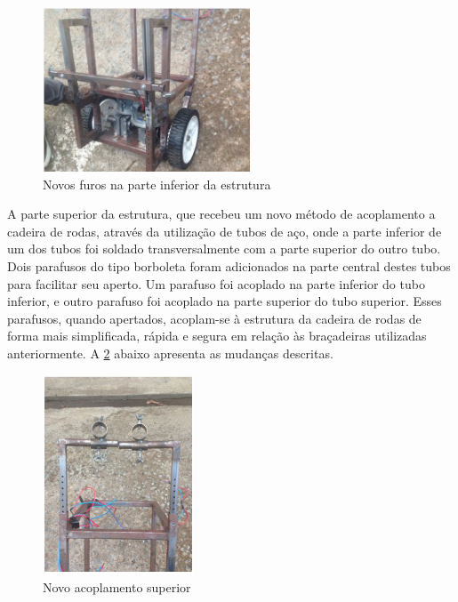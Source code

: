 \begin{figure}[!htb]
\centering
\includegraphics[width=0.55\textwidth]{figuras/resultados/furos_estrutura}
\caption{Novos furos na parte inferior da estrutura}
\label{fig:furos_estrutura}
\end{figure}

A parte superior da estrutura, que recebeu um novo método de acoplamento a cadeira de rodas, através da utilização de tubos de aço, onde a parte inferior de um dos tubos foi soldado transversalmente com a parte superior do outro tubo. Dois parafusos do tipo borboleta foram adicionados na parte central destes tubos para facilitar seu aperto. Um parafuso foi acoplado na parte inferior do tubo inferior, e outro parafuso foi acoplado na parte superior do tubo superior. Esses parafusos, quando apertados, acoplam-se à estrutura da cadeira de rodas de forma mais simplificada, rápida e segura em relação às braçadeiras utilizadas anteriormente. A \ref{fig:novo_acoplamento_superior} abaixo apresenta as mudanças descritas.

\begin{figure}[!htb]
\centering
\includegraphics[width=0.4\textwidth]{figuras/resultados/novo_acoplamento_superior}
\caption{Novo acoplamento superior}
\label{fig:novo_acoplamento_superior}
\end{figure}

